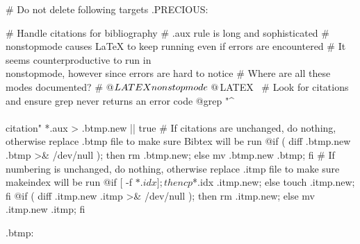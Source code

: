 # Do not delete following targets
.PRECIOUS: %

# Handle citations for bibliography
# .aux rule is long and sophisticated
# \\nonstopmode causes LaTeX to keep running even if errors are encountered
# It seems counterproductive to run in \\nonstopmode, however since errors are hard to notice
# Where are all these modes documented?
#	@${LATEX} \\nonstopmode \
	@${LATEX} \
# Look for citations and ensure grep never returns an error code
	@grep "^\\\\citation" *.aux > .btmp.new || true
# If citations are unchanged, do nothing, otherwise replace .btmp file to make sure Bibtex will be run
	@if ( diff .btmp.new .btmp >& /dev/null ); then rm .btmp.new; else mv .btmp.new .btmp; fi
# If numbering is unchanged, do nothing, otherwise replace .itmp file to make sure makeindex will be run
	@if [ -f $*.idx ]; then cp $*.idx .itmp.new; else touch .itmp.new; fi
	@if ( diff .itmp.new .itmp >& /dev/null ); then rm .itmp.new; else mv .itmp.new .itmp; fi

.btmp:

